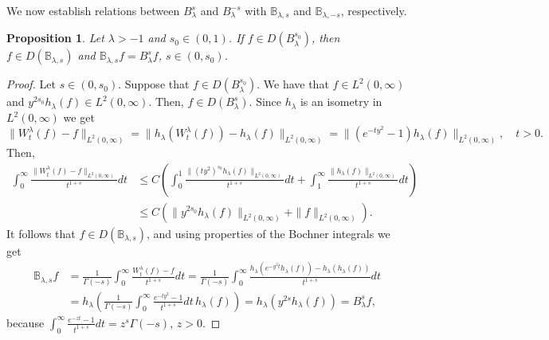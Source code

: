 \documentclass[10pt,a4paper]{amsart}
\newtheorem{prop}[thm]{Proposition}
\numberwithin{equation}{section}
\begin{document}
We now establish relations between $B_\lambda^s$ and $B_\lambda^{-s}$ with $\mathbb B_{\lambda , s}$ and $\mathbb B_{\lambda , -s}$, respectively.


\begin{prop}\label{prop: Prop2.1}
  Let $\lambda >-1$ and $s_0\in (0,1)$. If $f\in D(B_\lambda^{s_0})$, then $f\in D(\mathbb B_{\lambda ,s})$ and $\mathbb B_{\lambda ,s}f=B_\lambda^sf$, $s\in (0,s_0)$.  
\end{prop}
\begin{proof}
Let $s\in (0,s_0)$. Suppose that $f\in D(B_\lambda^{s_0})$. We have that $f\in L^2(0,\infty)$ and $y^{2{s_0}}h_\lambda (f)\in L^2(0,\infty)$. Then, $f\in D(B_\lambda^s)$. Since $h_\lambda $ is an isometry in $L^2(0,\infty)$ we get
\[
\|W_t^\lambda (f)-f\|_{L^2 (0,\infty)}=\|h_\lambda (W_t^\lambda (f))-h_\lambda (f)\|_{L^2(0,\infty)}=\|(e^{-ty^2}-1)h_\lambda (f)\|_{L^2(0,\infty)},\quad t>0.
\]
Then,
\begin{align*}
    \int_0^\infty \frac{\|W_t^\lambda (f)-f\|_{L^2(0,\infty)}}{t^{1+s}}dt&\leq C\left(\int_0^1\frac{\|(ty^2)^{s_0}h_\lambda (f)\|_{L^2(0,\infty)}}{t^{1+s}}dt+\int_1^\infty \frac{\|h_\lambda (f)\|_{L^2(0,\infty)}}{t^{1+s}}dt\right)\\
    &\leq C\left(\|y^{2s_0}h_\lambda (f)\|_{L^2(0,\infty)}+\|f\|_{L^2(0,\infty)}\right).
\end{align*}
It follows that $f\in D(\mathbb B_{\lambda ,s})$, and using properties of the Bochner integrals we get
\begin{align*}
\mathbb B_{\lambda ,s}f&=\frac{1}{\Gamma (-s)}\int_0^\infty \frac{W_t^\lambda (f)-f}{t^{1+s}}dt=\frac{1}{\Gamma (-s)}\int_0^\infty\frac{h_\lambda (e^{-y^2t}h_\lambda (f))-h_\lambda (h_\lambda (f))}{t^{1+s}}dt\\
    &=h_\lambda \left(\frac{1}{\Gamma (-s)}\int_0^\infty \frac{e^{-ty^2}-1}{t^{1+s}}dt\,h_\lambda (f)\right)=h_\lambda (y^{2s}h_\lambda (f))=B_\lambda^sf,
\end{align*}
because $\int_0^\infty \frac{e^{-zt}-1}{t^{1+s}}dt=z^s\Gamma (-s)$, $z>0$.
\end{proof}
\end{document}

